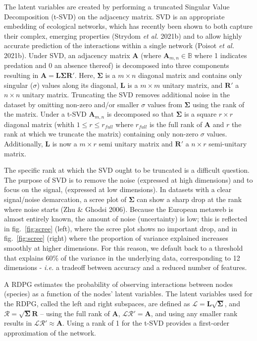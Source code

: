 \documentclass[11pt]{article}
\begin{document}
The latent variables are created by performing a truncated Singular
Value Decomposition (t-SVD) on the adjacency matrix. SVD is an
appropriate embedding of ecological networks, which has recently been
shown to both capture their complex, emerging properties (Strydom
\emph{et al.} 2021b) and to allow highly accurate prediction of the
interactions within a single network (Poisot \emph{et al.} 2021b). Under
SVD, an adjacency matrix \(\mathbf{A}\) (where
\(\mathbf{A}_{m,n}\in\mathbb{B}\) where 1 indicates predation and 0 an
absence thereof) is decomposed into three components resulting in
\(\mathbf{A} = \mathbf{L}\mathbf{\Sigma}\mathbf{R'}.\) Here,
\(\mathbf{\Sigma}\) is a \(m \times n\) diagonal matrix and contains
only singular (\(\sigma\)) values along its diagonal, \(\mathbf{L}\) is
a \(m \times m\) unitary matrix, and \(\mathbf{R}'\) a \(n \times n\)
unitary matrix. Truncating the SVD removes additional noise in the
dataset by omitting non-zero and/or smaller \(\sigma\) values from
\(\mathbf{\Sigma}\) using the rank of the matrix. Under a t-SVD
\(\mathbf{A}_{m,n}\) is decomposed so that \(\mathbf{\Sigma}\) is a
square \(r \times r\) diagonal matrix (whith \(1 \le r \le r_{full}\)
where \(r_{full}\) is the full rank of \(\mathbf{A}\) and \(r\) the rank
at which we truncate the matrix) containing only non-zero \(\sigma\)
values. Additionally, \(\mathbf{L}\) is now a \(m \times r\) semi
unitary matrix and \(\mathbf{R}'\) a \(n \times r\) semi-unitary matrix.

The specific rank at which the SVD ought to be truncated is a difficult
question. The purpose of SVD is to remove the noise (expressed at high
dimensions) and to focus on the signal, (expressed at low dimensions).
In datasets with a clear signal/noise demarcation, a scree plot of
\(\mathbf{\Sigma}\) can show a sharp drop at the rank where noise starts
(Zhu \& Ghodsi 2006). Because the European metaweb is almost entirely
known, the amount of noise (uncertainty) is low; this is reflected in
fig.~\ref{fig:scree} (left), where the scree plot shows no important
drop, and in fig.~\ref{fig:scree} (right) where the proportion of
variance explained increases smoothly at higher dimensions. For this
reason, we default back to a threshold that explains 60\% of the
variance in the underlying data, corresponding to 12 dimensions -
\emph{i.e.} a tradeoff between accuracy and a reduced number of
features.

A RDPG estimates the probability of observing interactions between nodes
(species) as a function of the nodes' latent variables. The latent
variables used for the RDPG, called the left and right subspaces, are
defined as \(\mathscr{L} = \mathbf{L}\sqrt{\mathbf{\Sigma}}\), and
\(\mathscr{R} = \sqrt{\mathbf{\Sigma}}\mathbf{R}\) -- using the full
rank of \(\mathbf{A}\), \(\mathscr{L}\mathscr{R}' = \mathbf{A}\), and
using any smaller rank results in
\(\mathscr{L}\mathscr{R}' \approx \mathbf{A}\). Using a rank of 1 for
the t-SVD provides a first-order approximation of the network.
\end{document}
